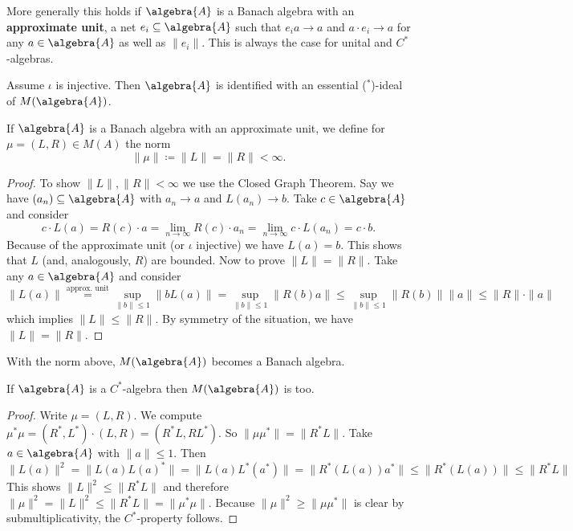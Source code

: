 \documentclass[a4paper]{article}
\begin{document}
More generally this holds if $\algebra{A}$ is a Banach algebra with an \textbf{approximate unit}, a net $e_i \subseteq \algebra{A}$ such that $e_i a \to a$ and $a \cdot e_i \to a$ for any $a \in \algebra{A}$ as well as $\|e_i\|$.
This is always the case for unital and $C^*$-algebras.

Assume $\iota$ is injective. Then $\algebra{A}$ is identified with an essential ($^*$)-ideal of $M(\algebra{A})$.

\begin{remark}
	If $\algebra{A}$ is a Banach algebra with an approximate unit, we define for $\mu = (L,R) \in M(A)$ the norm 
	\begin{equation*}
		\|\mu\| \coloneq \|L\| = \|R\| < \infty\text{.}
	\end{equation*}
\end{remark}

\begin{proof}
	To show $\|L\|, \|R\| < \infty$ we use the Closed Graph Theorem. 
	Say we have $(a_n) \subseteq \algebra{A}$ with $a_n \to a$ and $L(a_n) \to b$.
	Take $c \in \algebra{A}$ and consider
	\begin{equation*}
		c\cdot L(a) = R(c) \cdot a  = \lim_{n \to \infty} R(c) \cdot a_n = \lim_{n \to \infty} c \cdot L(a_n) = c \cdot b\text{.}
	\end{equation*}
	Because of the approximate unit (or $\iota$ injective) we have $L(a) = b$.
	This shows that $L$ (and, analogously, $R$) are bounded.
	Now to prove $\|L\| = \|R\|$. Take any $a \in \algebra{A}$ and consider
	\begin{equation*}
		\|L(a)\| \overset{\text{approx. unit}}{=} \sup_{\|b\| \leq 1} \|b L(a) \| = \sup_{\|b\| \leq 1} \|R(b) a\| \leq \sup_{\|b\| \leq 1} \|R(b)\|  \|a\| \leq \|R\|  \cdot \|a\|
	\end{equation*}
	which implies $\|L\| \leq \|R\|$.
	By symmetry of the situation, we have $\|L\| = \|R\|$.
\end{proof}

With the norm above, $M(\algebra{A})$ becomes a Banach algebra.

\begin{proposition}
	If $\algebra{A}$ is a $C^*$-algebra then $M(\algebra{A})$ is too.
\end{proposition}


\begin{proof}
	Write $\mu = (L,R)$.
	We compute $\mu^* \mu = (R^*, L^*) \cdot (L, R) = (R^* L, R L^*)$.
	So $\|\mu \mu^*\| = \| R^* L \|$.
	Take $a \in \algebra{A}$ with $\|a\| \leq 1$.
	Then
	\begin{equation*}
		\|L(a)\|^2 = \|L(a) L(a)^* \| = \|L(a) L^*(a^*) \| = \| R^*(L(a)) a^* \| \leq \| R^*(L(a)) \| \leq \|R^* L\|
	\end{equation*}
	This shows $\|L\|^2 \leq \|R^* L\|$ and therefore $\|\mu\|^2 = \|L\|^2 \leq \|R^* L\| = \| \mu^* \mu\|$.
	Because $\|\mu\|^2 \geq \|\mu \mu^*\|$ is clear by submultiplicativity, the $C^*$-property follows.
\end{proof}
\end{document}
